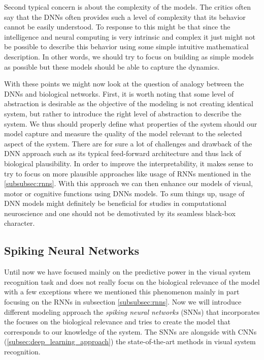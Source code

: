 Second typical concern is about the complexity of the models. The critics often say that the DNNs often provides such a level of complexity that its behavior cannot be easily understood. To response to this might be that since the intelligence and neural computing is very intrinsic and complex it just might not be possible to describe this behavior using some simple intuitive mathematical description. In other words, we should try to focus on building as simple models as possible but these models should be able to capture the dynamics.

With these points we might now look at the question of analogy between the DNNs and biological networks. First, it is worth noting that some level of abstraction is desirable as the objective of the modeling is not creating identical system, but rather to introduce the right level of abstraction to describe the system. We thus should properly define what properties of the system should our model capture and measure the quality of the model relevant to the selected aspect of the system. There are for sure a lot of challenges and drawback of the DNN approach such as its typical feed-forward architecture and thus lack of biological plausibility. In order to improve the interpretability, it makes sense to try to focus on more plausible approaches like usage of RNNs mentioned in the \ref{subsubsec:rnns}. With this approach we can then enhance our models of visual, motor or cognitive functions using DNNs models. To sum things up, usage of DNN models might definitely be beneficial for studies in computational neuroscience and one should not be demotivated by its seamless black-box character.

\subsection{Spiking Neural Networks}
\label{subsec:spiking_neural_nets}
Until now we have focused mainly on the predictive power in the visual system recognition task and does not really focus on the biological relevance of the model with a few exceptions where we mentioned this phenomenon mainly in part focusing on the RNNs in subsection \ref{subsubsec:rnns}. Now we will introduce different modeling approach the \emph{spiking neural networks} (SNNs) that incorporates the focuses on the biological relevance and tries to create the model that corresponds to our knowledge of the system. The SNNs are alongside with CNNs (\ref{subsec:deep_learning_approach}) the state-of-the-art methods in visual system recognition.

